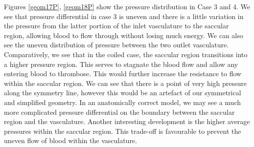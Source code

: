 \documentclass[journal,twoside,web]{ieeecolor}
\begin{document}
Figures \ref{geom17P}, \ref{geom18P} show the pressure distribution in Case 3 and 4. We see that pressure differential in case 3 is uneven and there is a little variation in the pressure from the latter portion of the inlet vasculature to the saccular region, allowing blood to flow through without losing much energy. We can also see the uneven distribution of pressure between the two outlet vasculature. Comparatively, we see that in the coiled case, the saccular region transitions into a higher pressure region. This serves to stagnate the blood flow and allow any entering blood to thrombose. This would further increase the resistance to flow within the saccular region. We can see that there is a point of very high pressure along the symmetry line, however this would be an artefact of our symmetrical and simplified geometry. In an anatomically correct model, we may see a much more complicated pressure differential on the boundary between the saccular region and the vasculature. Another interesting development is the higher average pressures within the saccular region. This trade-off is favourable to prevent the uneven flow of blood within the vasculature.
\end{document}
